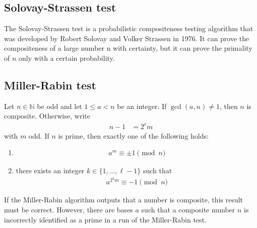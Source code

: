 \documentclass[a4paper, 12pt]{book} %
\begin{document}
\subsection{Solovay-Strassen test}

The Solovay-Strassen test is a probabilistic compositeness testing algorithm that was developed by Robert Solovay and Volker Strassen in 1976. It can prove the compositeness of a large number n with certainty, but it can prove the primality of $n$ only with a certain probability.

\subsection{Miller-Rabin test}


\begin{proposition}
    Let $n \in \mathbb{N}$ be odd and let $1 \leq a < n$ be an integer. If $\gcd(a, n) \neq 1$, then $n$ is composite. Otherwise, write
    \begin{align}
        n-1 &= 2^\ell m
    \end{align}
    with $m$ odd. If $n$ is prime, then exactly one of the following holds:
    \begin{enumerate}
        \item \begin{align}
        a^m \equiv \pm 1 \pmod{n}
    \end{align}
        \item there exists an integer $k \in \{1, \ldots, \ell-1\}$ such that
    \begin{align}
        a^{2^k m} \equiv -1 \pmod{n}
    \end{align}
    \end{enumerate}
\end{proposition}

If the Miller-Rabin algorithm outputs that a number is composite, this result must
be correct. However, there are bases $a$ such that a composite number $n$ is incorrectly identified as a prime in a run of the Miller-Rabin test.
\end{document}
